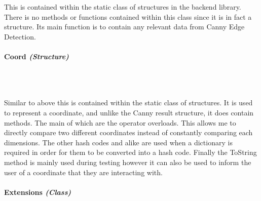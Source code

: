 \begin{FlushLeft}
    This is contained within the static class of structures in the backend library. There is no methods or functions contained within this class since it is in fact a structure. Its main function is to contain any relevant data from Canny Edge Detection.

    \bk

    \paragraph{Coord \textit{(Structure)}} \mbox{} \\

    \begin{figure}[H]
        \centering
    \end{figure}\\

    Similar to above this is contained within the static class of structures. It is used to represent a coordinate, and unlike the Canny result structure, it does contain methods. The main of which are the operator overloads. This allows me to directly compare two different coordinates instead of constantly comparing each dimensions. The other hash codes and alike are used when a dictionary is required in order for them to be converted into a hash code. Finally the ToString method is mainly used during testing however it can also be used to inform the user of a coordinate that they are interacting with.

    \bk
    \pagebreak
    \paragraph{Extensions \textit{(Class)}} \mbox{} \\

    \begin{figure}[H]
        \centering
    \end{figure}\\


\end{FlushLeft}

